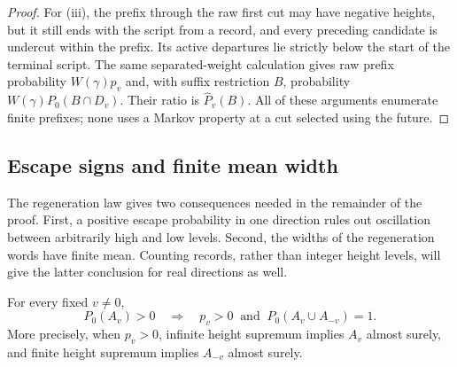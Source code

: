 \begin{proof}
For (iii), the prefix through the raw first cut may have negative
heights, but it still ends with the script from a record, and
every preceding candidate is undercut within the prefix.  Its active
departures lie strictly below the start of the terminal script.  The
same separated-weight calculation gives raw prefix probability
\(W(\gamma)p_v\) and, with suffix restriction \(B\), probability
\(W(\gamma)P_0(B\cap D_v)\).  Their ratio is
\(\widehat P_v(B)\).  All of these arguments enumerate finite
prefixes; none uses a Markov property at a cut selected using the
future.
\end{proof}

\subsection{Escape signs and finite mean width}

The regeneration law gives two consequences needed in the remainder of
the proof.  First, a positive escape probability in one direction rules
out oscillation between arbitrarily high and low levels.  Second, the
widths of the regeneration words have finite mean.  Counting records,
rather than integer height levels, will give the latter conclusion for
real directions as well.

\begin{proposition}\label{prop:sign-union}
For every fixed \(v\ne0\),
\begin{equation}\label{eq:sign-union}
 P_0(A_v)>0\quad\Longrightarrow\quad
 p_v>0\ \text{ and }\ P_0(A_v\cup A_{-v})=1.
\end{equation}
More precisely, when \(p_v>0\), infinite height supremum implies
\(A_v\) almost surely, and finite height supremum implies \(A_{-v}\)
almost surely.
\end{proposition}

